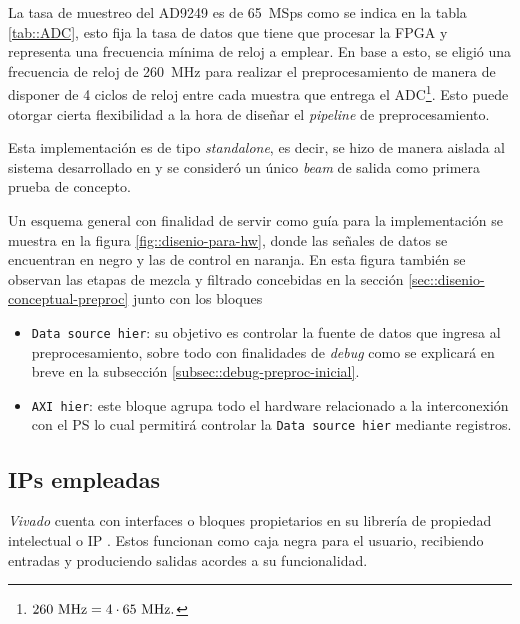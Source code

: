 \documentclass[../../main.tex]{subfiles}
\begin{document}
La tasa de muestreo del AD9249 es de 65~MSps como se indica en la tabla \ref{tab::ADC}, esto fija la tasa de datos que tiene que procesar la FPGA y representa una frecuencia mínima de reloj a emplear. En base a esto, se eligió una frecuencia de reloj de 260~MHz para realizar el preprocesamiento de manera de disponer de 4 ciclos de reloj entre cada muestra que entrega el ADC\footnote{$260~\textrm{MHz} = 4 \cdot 65~\textrm{MHz}.$}. Esto puede otorgar cierta flexibilidad a la hora de diseñar el \textit{pipeline} de preprocesamiento.

Esta implementación es de tipo \textit{standalone}, es decir, se hizo de manera aislada al sistema desarrollado en \cite{proyecto-jose} y se consideró un único \textit{beam} de salida como primera prueba de concepto.

Un esquema general con finalidad de servir como guía para la implementación se muestra en la figura \ref{fig::disenio-para-hw}, donde las señales de datos se encuentran en negro y las de control en naranja. En esta figura también se observan las etapas de mezcla y filtrado concebidas en la sección \ref{sec::disenio-conceptual-preproc} junto con los bloques
\begin{itemize}
    \item \texttt{Data source hier}: su objetivo es controlar la fuente de datos que ingresa al preprocesamiento, sobre todo con finalidades de \textit{debug} como se explicará en breve en la subsección \ref{subsec::debug-preproc-inicial}.
    \item \texttt{AXI hier}: este bloque agrupa todo el hardware relacionado a la interconexión con el PS lo cual permitirá controlar la \texttt{Data source hier} mediante registros.
\end{itemize}


\subsection{IPs empleadas}
\textit{Vivado} cuenta con interfaces o bloques propietarios en su librería de propiedad intelectual o IP \cite{IP-Xilinx}. Estos funcionan como caja negra para el usuario, recibiendo entradas y produciendo salidas acordes a su funcionalidad.
\end{document}
